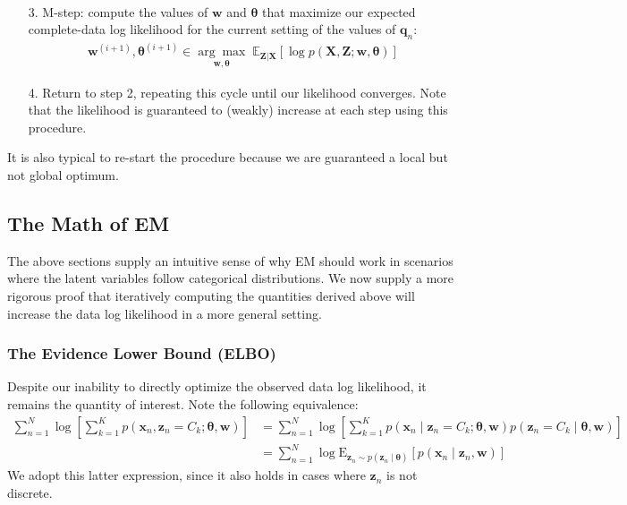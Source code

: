 \begin{itemize}
\begin{align*}
    \end{align*}
  \item[3.] M-step: compute the values of $\textbf{w}$ and $\boldsymbol{\theta}$ that maximize our expected complete-data log likelihood for the current setting of the values of $\textbf{q}_n$:
    \begin{align}\label{eq:em-1-m-step}
        \textbf{w}^{(i + 1)}, \boldsymbol{\theta}^{(i + 1)} \in \underset{\textbf{w}, \boldsymbol{\theta}}{\arg\max} \; \mathbb{E}_{\textbf{Z}|\textbf{X}}[\log p(\textbf{X}, \textbf{Z}; \textbf{w}, \boldsymbol{\theta})]
    \end{align}
    \item[4.] Return to step 2, repeating this cycle until our likelihood converges. Note that the likelihood is guaranteed to (weakly) increase at each step using this procedure.
    \end{itemize}

It is also typical to re-start the procedure because we are guaranteed a local but not global optimum.

\subsection{The Math of EM}

The above sections supply an intuitive sense of why EM should work in scenarios where the latent variables follow categorical distributions. We now supply a more rigorous proof that iteratively computing the quantities derived above will increase the data log likelihood in a more general setting.

\subsubsection{The Evidence Lower Bound (ELBO)}

Despite our inability to directly optimize the observed data log likelihood, it remains the quantity of interest. Note the following equivalence: 
\begin{align}
    \sum_{n = 1} ^N \log \left[\sum_{k = 1} ^K p(\mathbf{x}_n, \mathbf{z}_n = C_k; \boldsymbol\theta, \mathbf{w})\right] &= \sum_{n = 1} ^N \log \left[ \sum_{k = 1} ^K p(\mathbf{x}_n \mid \mathbf{z}_n = C_k; \boldsymbol\theta, \mathbf{w}) p(\mathbf{z}_n = C_k \mid \boldsymbol\theta, \mathbf{w} )\right] \\
    &= \sum_{n = 1} ^N \log \mathrm{E}_{\mathbf{z}_n \sim p(\mathbf{z}_n \mid \boldsymbol{\theta})} \left[ p(\mathbf{x}_n \mid \mathbf{z}_n, \mathbf{w})\right] \label{eq:expectation-log-likelihood}
\end{align}
We adopt this latter expression, since it also holds in cases where $\mathbf{z}_n$ is not discrete. 

